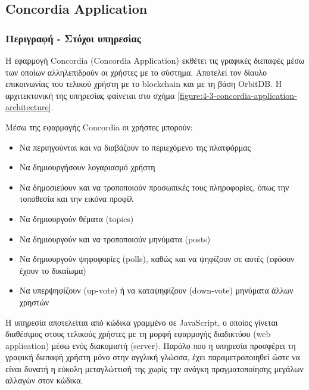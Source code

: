 \subsection{Concordia Application} \label{subsection:4-3-2-concordia-application-service}

\subsubsection{Περιγραφή - Στόχοι υπηρεσίας}


Η εφαρμογή Concordia (Concordia Application) εκθέτει τις γραφικές διεπαφές μέσω των οποίων αλληλεπιδρούν οι χρήστες με το σύστημα. Αποτελεί τον δίαυλο επικοινωνίας του τελικού χρήστη με το blockchain και με τη βάση OrbitDB. Η αρχιτεκτονική της υπηρεσίας φαίνεται στο σχήμα \ref{figure:4-3-concordia-application-architecture}.

Μέσω της εφαρμογής Concordia οι χρήστες μπορούν:

\begin{itemize}
    \item Να περιηγούνται και να διαβάζουν το περιεχόμενο της πλατφόρμας

    \item Να δημιουργήσουν λογαριασμό χρήστη

    \item Να δημοσιεύουν και να τροποποιούν προσωπικές τους πληροφορίες, όπως την τοποθεσία και την εικόνα προφίλ

    \item Να δημιουργούν θέματα (topics)

    \item Να δημιουργούν και να τροποποιούν μηνύματα (posts)

    \item Να δημιουργούν ψηφοφορίες (polls), καθώς και να ψηφίζουν σε αυτές (εφόσον έχουν το δικαίωμα)

    \item Να υπερψηφίζουν (up-vote) ή να καταψηφίζουν (down-vote) μηνύματα άλλων χρηστών
\end{itemize}

Η υπηρεσία αποτελείται από κώδικα γραμμένο σε JavaScript, ο οποίος γίνεται διαθέσιμος στους τελικούς χρήστες με τη μορφή εφαρμογής διαδικτύου (web application) μέσω ενός διακομιστή (server). Παρόλο που η υπηρεσία προσφέρει τη γραφική διεπαφή χρήστη μόνο στην αγγλική γλώσσα, έχει παραμετροποιηθεί ώστε να είναι δυνατή η εύκολη μεταγλώττισή της χωρίς την ανάγκη πραγματοποίησης μεγάλων αλλαγών στον κώδικα.

